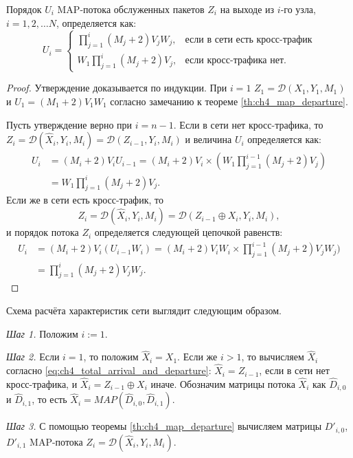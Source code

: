\begin{prop}\label{prop:ch4_departure_order}
	Порядок $U_i$ MAP-потока обслуженных пакетов $Z_i$ на выходе из $i$-го узла, $i = 1,2,\dots N$, определяется как:
	$$
	U_i = \begin{cases}
		\prod\limits_{j=1}^{i}(M_j + 2)V_jW_j,&\text{если в сети есть кросс-трафик}\\
		W_1\prod\limits_{j=1}^{i}(M_j + 2)V_j,&\text{если кросс-трафика нет}.
	\end{cases}
	$$
\end{prop}
\begin{proof}
Утверждение доказывается по индукции. При $i = 1$ $Z_1 = \mathcal{D}(X_1, Y_1, M_1)$ и $U_1 = (M_1 + 2)V_1W_1$ согласно замечанию к теореме \ref{th:ch4_map_departure}.

Пусть утверждение верно при $i = n-1$. Если в сети нет кросс-трафика, то $Z_i = \mathcal{D}(\hat{X}_i, Y_i, M_i) = \mathcal{D}(Z_{i-1}, Y_i, M_i)$ и величина $U_i$ определяется как:
$$
  \begin{aligned}
    U_i &= (M_i + 2) V_i U_{i-1} = (M_i + 2) V_i \times (W_1 \prod\limits_{j=1}^{i-1}(M_j + 2)V_j)\\
    &= W_1 \prod\limits_{j=1}^{i}(M_j + 2)V_j.
  \end{aligned}
$$
Если же в сети есть кросс-трафик, то
$$
  Z_i = \mathcal{D}(\hat{X}_i, Y_i, M_i) = \mathcal{D}(Z_{i-1} \oplus X_i, Y_i, M_i),
$$
и порядок потока $Z_i$ определяется следующей цепочкой равенств:
$$
  \begin{aligned}
    U_i &= (M_i + 2) V_i (U_{i-1} W_i) = (M_i + 2) V_i W_i \times \prod\limits_{j=1}^{i-1}(M_j + 2) V_j W_j)\\
    &= \prod\limits_{j=1}^{i}(M_j + 2) V_j W_j.
  \end{aligned}
$$
\end{proof}

Схема расчёта характеристик сети выглядит следующим образом.

\textit{Шаг 1.} Положим $i := 1$.

\textit{Шаг 2.} Если $i = 1$, то положим $\hat{X}_i = X_1$. Если же $i > 1$, то вычисляем $\hat{X}_i$ согласно \eqref{eq:ch4_total_arrival_and_departure}: $\hat{X}_i = Z_{i-1}$, если в сети нет кросс-трафика, и $\hat{X}_i = Z_{i-1} \oplus X_i$ иначе. Обозначим матрицы потока $\hat{X}_i$ как $\hat{D}_{i,0}$ и $\hat{D}_{i,1}$, то есть $\hat{X}_i = MAP(\hat{D}_{i,0}, \hat{D}_{i,1})$.

\textit{Шаг 3.} С помощью теоремы \ref{th:ch4_map_departure} вычисляем матрицы $D'_{i,0}$, $D'_{i,1}$ MAP-потока $Z_i = \mathcal{D}(\hat{X}_i, Y_i, M_i)$.

